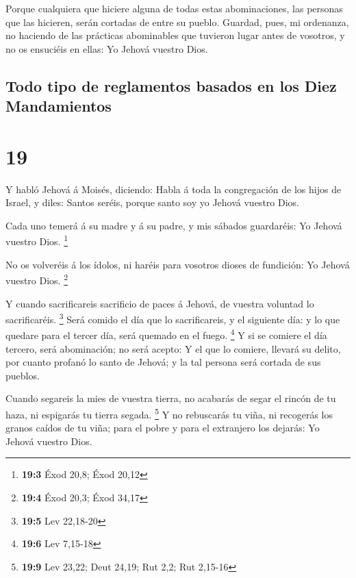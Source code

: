  Porque cualquiera que hiciere alguna de todas estas
abominaciones, las personas que las hicieren, serán cortadas de entre su
pueblo.  Guardad, pues, mi ordenanza, no haciendo de las
prácticas abominables que tuvieron lugar antes de vosotros, y no os
ensuciéis en ellas: Yo Jehová vuestro Dios.

\hypertarget{todo-tipo-de-reglamentos-basados-en-los-diez-mandamientos}{%
\subsection{Todo tipo de reglamentos basados \hspace{0pt}\hspace{0pt}en
los Diez
Mandamientos}\label{todo-tipo-de-reglamentos-basados-en-los-diez-mandamientos}}

\hypertarget{section-18}{%
\section{19}\label{section-18}}

 Y habló Jehová á Moisés, diciendo:  Habla á
toda la congregación de los hijos de Israel, y diles: Santos seréis,
porque santo soy yo Jehová vuestro Dios.

 Cada uno temerá á su madre y á su padre, y mis sábados
guardaréis: Yo Jehová vuestro Dios. \footnote{\textbf{19:3} Éxod 20,8;
  Éxod 20,12}

 No os volveréis á los ídolos, ni haréis para vosotros
dioses de fundición: Yo Jehová vuestro Dios. \footnote{\textbf{19:4}
  Éxod 20,3; Éxod 34,17}

 Y cuando sacrificareis sacrificio de paces á Jehová, de
vuestra voluntad lo sacrificaréis. \footnote{\textbf{19:5} Lev 22,18-20}
 Será comido el día que lo sacrificareis, y el siguiente
día: y lo que quedare para el tercer día, será quemado en el fuego.
\footnote{\textbf{19:6} Lev 7,15-18}  Y si se comiere el día
tercero, será abominación; no será acepto:  Y el que lo
comiere, llevará su delito, por cuanto profanó lo santo de Jehová; y la
tal persona será cortada de sus pueblos.

 Cuando segareis la mies de vuestra tierra, no acabarás de
segar el rincón de tu haza, ni espigarás tu tierra segada. \footnote{\textbf{19:9}
  Lev 23,22; Deut 24,19; Rut 2,2; Rut 2,15-16}  Y no
rebuscarás tu viña, ni recogerás los granos caídos de tu viña; para el
pobre y para el extranjero los dejarás: Yo Jehová vuestro Dios.

